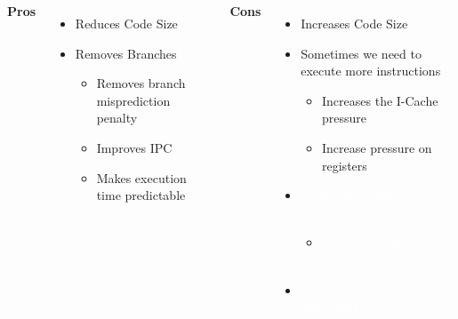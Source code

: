     \begin{columns}[t] %
            \textbf{Pros}
            \begin{itemize}
                \item Reduces Code Size
                \item Removes Branches
                \begin{itemize}
                    \item Removes branch misprediction penalty
                    \item Improves IPC
                    \item Makes execution time predictable
                \end{itemize}
            \end{itemize}

            \textbf{Cons}
            \begin{itemize}
                \item Increases Code Size
                \item Sometimes we need to execute more instructions
                \begin{itemize}
                    \item Increases the I-Cache pressure
                    \item Increase pressure on registers
                \end{itemize}
                \item \textcolor{white}{Makes the architecture more complex}
                \begin{itemize}
                    \item \textcolor{white}{More area and power consumption}
                \end{itemize}
                \item \textcolor{white}{Does not interact positively with OOO}
                
                
            \end{itemize}
    \end{columns}
    